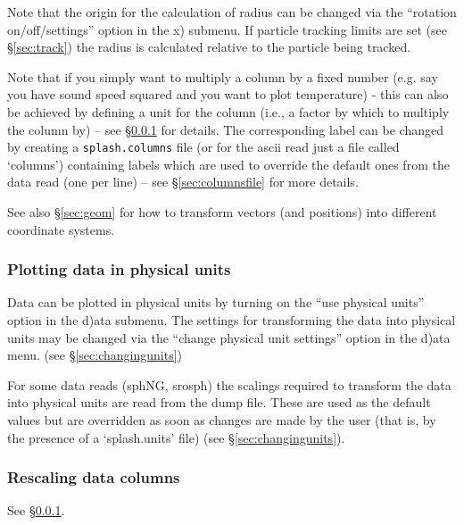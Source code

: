 \documentclass[a4paper,10pt]{article}
\begin{document}
 Note that the origin for the calculation of radius can be changed via the ``rotation on/off/settings'' option in the x) submenu. If particle tracking limits are set (see \S\ref{sec:track}) the radius is calculated relative to the particle being tracked.
  
 Note that if you simply want to multiply a column by a fixed number (e.g. say you have sound speed squared and you want to plot temperature) - this can also be achieved by defining a unit for the column (i.e., a factor by which to multiply the column by) -- see \S\ref{sec:physicalunits} for details. The corresponding label can be changed by creating a \verb+splash.columns+ file (or for the ascii read just a file called `columns') containing labels which are used to override the default ones from the data read (one per line) -- see \S\ref{sec:columnsfile} for more details.

See also \S\ref{sec:geom} for how to transform vectors (and positions) into different coordinate systems.

\subsubsection{ Plotting data in physical units}
\label{sec:physicalunits}
 Data can be plotted in physical units by turning on the ``use physical units'' option in the d)ata submenu. The settings for transforming the data into physical units may be changed via the ``change physical unit settings'' option in the d)ata menu. (see \S\ref{sec:changingunits})

 For some data reads (sphNG, srosph) the scalings required to transform the data into physical units are read from the dump file. These are used as the default values but are overridden as soon as changes are made by the user (that is, by the presence of a `splash.units' file) (see \S\ref{sec:changingunits}).
 
\subsubsection{ Rescaling data columns}
See \S\ref{sec:physicalunits}.
\end{document}
